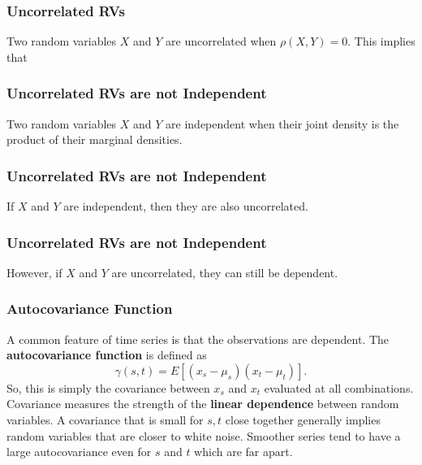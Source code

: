 \documentclass[%
xcolor=pdftex]{beamer}
\begin{document}
\begin{frame}
\frametitle{Uncorrelated RVs}

Two random variables $X$ and $Y$ are uncorrelated when $\rho(X,Y) = 0$. This implies that

\vspace{40mm}

\end{frame}

\begin{frame}
\frametitle{Uncorrelated RVs are not Independent}

Two random variables $X$ and $Y$ are independent when their joint density is the product of their marginal densities.

\vspace{40mm}

\end{frame}

\begin{frame}
\frametitle{Uncorrelated RVs are not Independent}

If $X$ and $Y$ are independent, then they are also uncorrelated.


\vspace{50mm}

\end{frame}

\begin{frame}
\frametitle{Uncorrelated RVs are not Independent}

However, if $X$ and $Y$ are uncorrelated, they can still be dependent.

\vspace{50mm}

\end{frame}


\begin{frame}
\frametitle{Autocovariance Function}

A common feature of time series is that the observations are dependent. The \textbf{autocovariance function} is defined
as
\begin{equation} \label{eq:autocovariance}
\gamma(s,t)=E[(x_s-\mu_s)(x_t-\mu_t)].
\end{equation}
So, this is simply the covariance between $x_s$ and $x_t$
evaluated at  all combinations.  Covariance measures the
strength of the \textbf{linear dependence} between random variables.  A
covariance that is small for $s,t$ close together generally
implies random variables that are closer to white noise.
Smoother series tend to have a large autocovariance even for
$s$ and $t$ which are far apart.

\end{frame}
\end{document}

